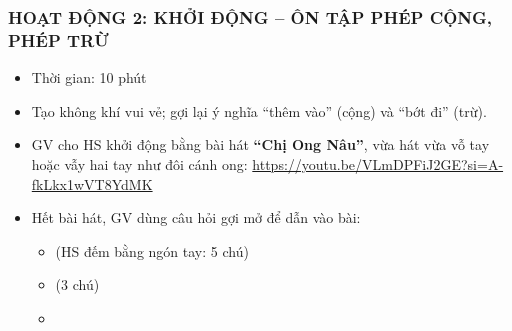 \documentclass[../main.tex]{subfiles}
\begin{document}
\subsubsection{HOẠT ĐỘNG 2: KHỞI ĐỘNG -- ÔN TẬP PHÉP CỘNG, PHÉP TRỪ}
\begin{hd}
    \begin{itemize}
        \item Thời gian: 10 phút
        \item Tạo không khí vui vẻ; gợi lại ý nghĩa “thêm vào” (cộng) và “bớt đi” (trừ).
    \end{itemize}
\end{hd}
\begin{itemize}
    \item GV cho HS khởi động bằng bài hát \textbf{“Chị Ong Nâu”}, vừa hát vừa vỗ tay hoặc vẫy hai tay như đôi cánh ong: \url{https://youtu.be/VLmDPFiJ2GE?si=A-fkLkx1wVT8YdMK}
    \item Hết bài hát, GV dùng câu hỏi gợi mở để dẫn vào bài:
    \begin{itemize}
        \item[--]  (HS đếm bằng ngón tay: 5 chú)
        \item[--]  (3 chú)
        \item[--] 
    \end{itemize}
\end{itemize}
\begin{center}
\end{center}

\end{document}
